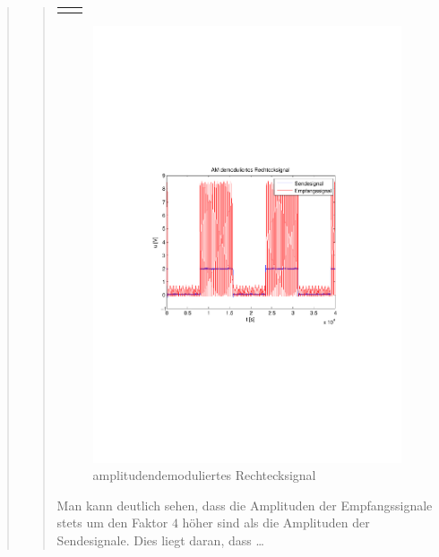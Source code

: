 \begin{quote}
\begin{quote}
\begin{center}
\begin{tabular}{ll}
\begin{minipage}{0.6\textwidth}
                \end{minipage}

            \end{tabular}
            \end{center}
            
             \begin{figure}[H] \centering
                    \includegraphics[scale=0.5, trim = 2cm 6.5cm 1.5cm 8.5cm,
                    clip]{./Bilder/synchDemod_rechteck}
                        \caption{amplitudendemoduliertes Rechtecksignal}
                \end{figure}
                
                Man kann deutlich sehen, dass die Amplituden der Empfangssignale
                stets um den Faktor $4$ höher sind als die Amplituden der
                Sendesignale. Dies liegt daran, dass \ldots
                

\end{quote}
\end{quote}
